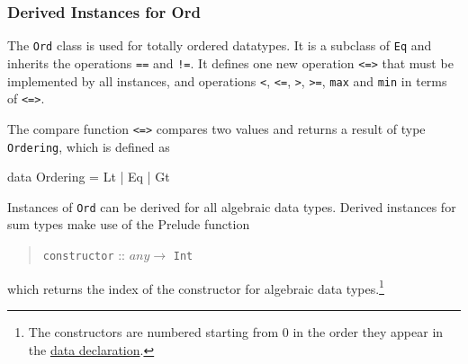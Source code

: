 \subsubsection{Derived Instances for Ord}
The \texttt{Ord} class is used for totally ordered datatypes. It is a subclass of \texttt{Eq} and inherits the operations \texttt{==} and \texttt{!=}. It defines one new operation \texttt{<=>} that must be implemented by all instances, and operations \texttt{<}, \texttt{<=}, \texttt{>}, \texttt{>=}, \texttt{max} and \texttt{min} in terms of \texttt{<=>}.

The compare function \texttt{<=>} compares two values and returns a result of type \texttt{Ordering}, which is defined as
\begin{code}
    data Ordering = Lt | Eq | Gt
\end{code}

Instances of \texttt{Ord} can be derived for all algebraic data types. Derived instances for sum types make use of the Prelude function
\begin{quote}
\texttt{constructor} :: $any \rightarrow$ \texttt{Int}
\end{quote}
which returns the index of the constructor for algebraic data types.\footnote{The constructors are numbered starting from 0 in the order they appear in the \hyperref[datadcl]{data declaration}.}

